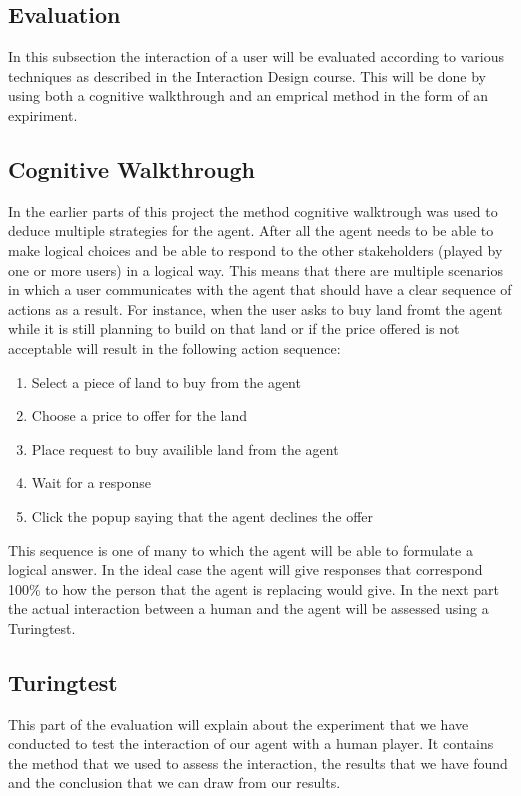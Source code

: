 \subsection{Evaluation}
In this subsection the interaction of a user will be evaluated according to various techniques as described in the Interaction Design course. This will be done by using both a cognitive walkthrough and an emprical method in the form of an expiriment.

\subsection{Cognitive Walkthrough}

In the earlier parts of this project the method cognitive walktrough was used to deduce multiple strategies for the agent. After all the agent needs to be able to make logical choices and be able to respond to the other stakeholders (played by one or more users) in a logical way. This means that there are multiple scenarios in which a user communicates with the agent that should have a clear sequence of actions as a result. For instance, when the user asks to buy land fromt the agent while it is still planning to build on that land or if the price offered is not acceptable will result in the following action sequence: 
\begin{enumerate}
\item Select a piece of land to buy from the agent
\item Choose a price to offer for the land
\item Place request to buy availible land from the agent
\item Wait for a response
\item Click the popup saying that the agent declines the offer
\end{enumerate}

This sequence is one of many to which the agent will be able to formulate a logical answer. In the ideal case the agent will give responses that correspond 100\% to how the person that the agent is replacing would give. In the next part the actual interaction between a human and the agent will be assessed using a Turingtest.

\subsection{Turingtest}
This part of the evaluation will explain about the experiment that we have conducted to test the interaction of our agent with a human player. It contains the method that we used to assess the interaction, the results that we have found and the conclusion that we can draw from our results. 

